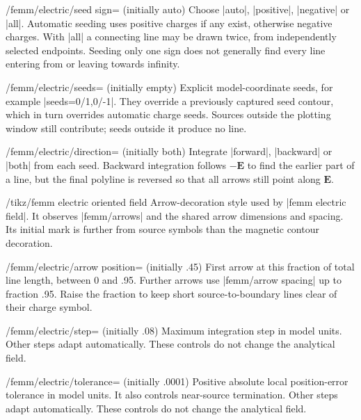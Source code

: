 \begin{key}{/femm/electric/seed sign= (initially auto)}
Choose |auto|, |positive|, |negative| or |all|. Automatic seeding uses positive
charges if any exist, otherwise negative charges. With |all| a connecting line
may be drawn twice, from independently selected endpoints. Seeding only one sign
does not generally find every line entering from or leaving towards infinity.
\end{key}

\begin{key}{/femm/electric/seeds= (initially \normalfont empty)}
Explicit model-coordinate seeds, for example |seeds={0/1,0/-1}|.
They override a previously captured seed contour, which in turn overrides
automatic charge seeds. Sources outside the plotting window still contribute;
seeds outside it produce no line.
\end{key}

\begin{key}{/femm/electric/direction= (initially both)}
Integrate |forward|, |backward| or |both| from each seed. Backward integration
follows $-\mathbf E$ to find the earlier part of a line, but the final polyline
is reversed so that all arrows still point along $\mathbf E$.
\end{key}

\begin{key}{/tikz/femm electric oriented field}
Arrow-decoration style used by |femm electric field|. It observes |femm/arrows|
and the shared arrow dimensions and spacing. Its initial mark is further from
source symbols than the magnetic contour decoration.
\end{key}

\begin{key}{/femm/electric/arrow position= (initially .45)}
First arrow at this fraction of total line length, between 0 and .95.
Further arrows use |femm/arrow spacing| up to fraction .95. Raise the fraction
to keep short source-to-boundary lines clear of their charge symbol.
\end{key}

\begin{key}{/femm/electric/step= (initially .08)}
Maximum integration step in model units. Other steps adapt automatically. These controls do not change the analytical field.
\end{key}

\begin{key}{/femm/electric/tolerance= (initially .0001)}
Positive absolute local position-error tolerance in model units. It also controls near-source termination. Other steps adapt automatically. These controls do not change the analytical field.
\end{key}

